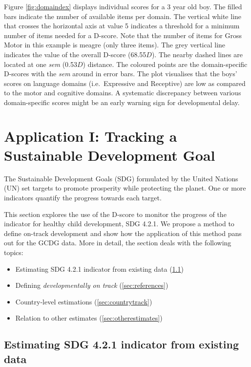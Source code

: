 \documentclass[
]{book}
\providecommand{\tightlist}{%
  \setlength{\itemsep}{0pt}\setlength{\parskip}{0pt}}
\begin{document}
Figure \ref{fig:domaindex} displays individual scores for a 3 year old boy. The filled bars indicate the number of available items per domain. The vertical white line that crosses the horizontal axis at value 5 indicates a threshold for a minimum number of items needed for a D-score. Note that the number of items for Gross Motor in this example is meagre (only three items). The grey vertical line indicates the value of the overall D-score (68.55\(D\)). The nearby dashed lines are located at one \emph{sem} (0.53\(D\)) distance. The coloured points are the domain-specific D-scores with the \emph{sem} around in error bars. The plot visualises that the boys' scores on language domains (i.e.~Expressive and Receptive) are low as compared to the motor and cognitive domains. A systematic discrepancy between various domain-specific scores might be an early warning sign for developmental delay.

\newpage

\hypertarget{ch:SDGindicator}{%
\chapter{Application I: Tracking a Sustainable Development Goal}\label{ch:SDGindicator}}

The Sustainable Development Goals (SDG) formulated by the United Nations (UN) set targets to promote prosperity while protecting the planet. One or more indicators quantify the progress towards each target.

This section explores the use of the D-score to monitor the progress of the indicator for healthy child development, SDG 4.2.1. We propose a method to define on-track development and show how the application of this method pans out for the GCDG data. More in detail, the section deals with the following topics:

\begin{itemize}
\tightlist
\item
  Estimating SDG 4.2.1 indicator from existing data (\ref{sec:application1})
\item
  Defining \emph{developmentally on track} (\ref{sec:references})
\item
  Country-level estimations (\ref{sec:countrytrack})
\item
  Relation to other estimates (\ref{sec:otherestimates})
\end{itemize}

\hypertarget{sec:application1}{%
\section{Estimating SDG 4.2.1 indicator from existing data}\label{sec:application1}}
\end{document}
